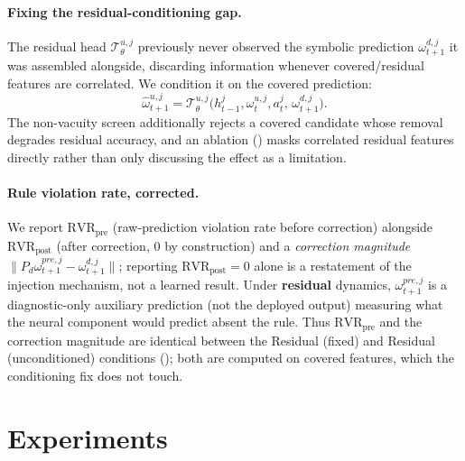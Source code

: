 \documentclass[letterpaper]{article} %
\let\autoref\Cref
\theoremstyle{plain}
\theoremstyle{definition}
\theoremstyle{remark}
\begin{document}
\paragraph{Fixing the residual-conditioning gap.} The residual head $\mathcal{T}^{u,j}_\theta$ previously never observed the symbolic prediction $\omega^{d,j}_{t+1}$ it was assembled alongside, discarding information whenever covered/residual features are correlated. We condition it on the covered prediction:
\begin{equation}
  \hat\omega^{u,j}_{t+1} = \mathcal{T}^{u,j}_\theta\big(h^j_{t-1}, \omega^{u,j}_t, a^j_t,\, \omega^{d,j}_{t+1}\big).
\end{equation}
The non-vacuity screen additionally rejects a covered candidate whose removal degrades residual accuracy, and an ablation (\autoref{sec:exp}) masks correlated residual features directly rather than only discussing the effect as a limitation.

\paragraph{Rule violation rate, corrected.} We report $\mathrm{RVR}_{\mathrm{pre}}$ (raw-prediction violation rate before correction) alongside $\mathrm{RVR}_{\mathrm{post}}$ (after correction, $0$ by construction) and a \emph{correction magnitude} $\|P_d\hat\omega^{pre,j}_{t+1}-\omega^{d,j}_{t+1}\|$; reporting $\mathrm{RVR}_{\mathrm{post}}=0$ alone is a restatement of the injection mechanism, not a learned result. Under \textbf{residual} dynamics, $\omega^{pre,j}_{t+1}$ is a diagnostic-only auxiliary prediction (not the deployed output) measuring what the neural component would predict absent the rule. Thus $\mathrm{RVR}_{\mathrm{pre}}$ and the correction magnitude are identical between the Residual (fixed) and Residual (unconditioned) conditions (\autoref{sec:exp-injection}); both are computed on covered features, which the conditioning fix does not touch.

\section{Experiments}
\label{sec:exp}
\end{document}
